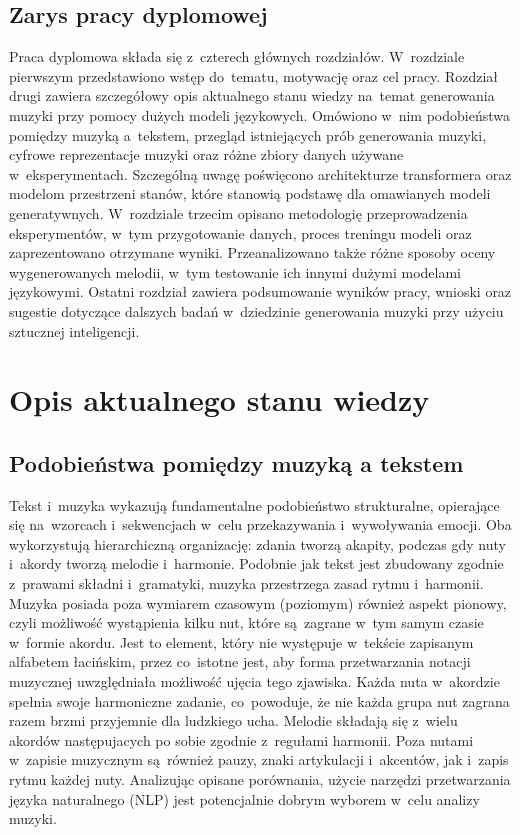 \documentclass[data-science]{agh-wi} %
\begin{document}
\section{Zarys pracy dyplomowej}
Praca dyplomowa składa się z~czterech głównych rozdziałów. W~rozdziale pierwszym przedstawiono wstęp do~tematu, motywację oraz cel pracy. Rozdział drugi zawiera szczegółowy opis aktualnego stanu wiedzy na~temat generowania muzyki przy pomocy dużych modeli językowych. Omówiono w~nim podobieństwa pomiędzy muzyką a~tekstem, przegląd istniejących prób generowania muzyki, cyfrowe reprezentacje muzyki oraz różne zbiory danych używane w~eksperymentach. Szczególną uwagę poświęcono architekturze transformera oraz modelom przestrzeni stanów, które stanowią podstawę dla omawianych modeli generatywnych. W~rozdziale trzecim opisano metodologię przeprowadzenia eksperymentów, w~tym przygotowanie danych, proces treningu modeli oraz zaprezentowano otrzymane wyniki. Przeanalizowano także różne sposoby oceny wygenerowanych melodii, w~tym testowanie ich innymi dużymi modelami językowymi. Ostatni rozdział zawiera podsumowanie wyników pracy, wnioski oraz sugestie dotyczące dalszych badań w~dziedzinie generowania muzyki przy użyciu sztucznej inteligencji.

\chapter{Opis aktualnego stanu wiedzy}
\section{Podobieństwa pomiędzy muzyką a tekstem}
Tekst i~muzyka wykazują fundamentalne podobieństwo strukturalne, opierające się na~wzorcach i~sekwencjach w~celu przekazywania i~wywoływania emocji. Oba wykorzystują hierarchiczną organizację: zdania tworzą akapity, podczas gdy nuty i~akordy tworzą melodie i~harmonie. Podobnie jak tekst jest zbudowany zgodnie z~prawami składni i~gramatyki, muzyka przestrzega zasad rytmu i~harmonii. Muzyka posiada poza wymiarem czasowym (poziomym) również aspekt pionowy, czyli możliwość wystąpienia kilku nut, które są~zagrane w~tym samym czasie w~formie akordu. Jest to element, który nie występuje w~tekście zapisanym alfabetem łacińskim, przez co~istotne jest, aby forma przetwarzania notacji muzycznej uwzględniała możliwość ujęcia tego zjawiska. Każda nuta w~akordzie spełnia swoje harmoniczne zadanie, co~powoduje, że nie każda grupa nut zagrana razem brzmi przyjemnie dla ludzkiego ucha. Melodie składają się z~wielu akordów następujacych po sobie zgodnie z~regułami harmonii. Poza nutami w~zapisie muzycznym są~również pauzy, znaki artykulacji i~akcentów, jak i~zapis rytmu każdej nuty. Analizując opisane porównania, użycie narzędzi przetwarzania języka naturalnego (NLP) jest potencjalnie dobrym wyborem w~celu analizy muzyki.
\end{document}
